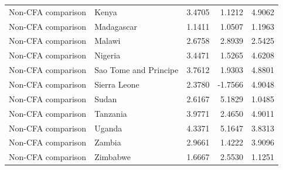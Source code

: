 \begin{table}
\begin{tabular}[t]{llrrr}
Non-CFA comparison & Kenya & 3.4705 & 1.1212 & 4.9062\\
\addlinespace
Non-CFA comparison & Madagascar & 1.1411 & 1.0507 & 1.1963\\
Non-CFA comparison & Malawi & 2.6758 & 2.8939 & 2.5425\\
Non-CFA comparison & Nigeria & 3.4471 & 1.5265 & 4.6208\\
Non-CFA comparison & Sao Tome and Principe & 3.7612 & 1.9303 & 4.8801\\
Non-CFA comparison & Sierra Leone & 2.3780 & -1.7566 & 4.9048\\
\addlinespace
Non-CFA comparison & Sudan & 2.6167 & 5.1829 & 1.0485\\
Non-CFA comparison & Tanzania & 3.9771 & 2.4650 & 4.9011\\
Non-CFA comparison & Uganda & 4.3371 & 5.1647 & 3.8313\\
Non-CFA comparison & Zambia & 2.9661 & 1.4222 & 3.9096\\
Non-CFA comparison & Zimbabwe & 1.6667 & 2.5530 & 1.1251\\
\bottomrule
\end{tabular}
\end{table}